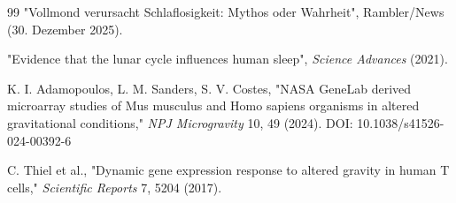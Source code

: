 \documentclass[12pt,a4paper]{article}
\theoremstyle{remark}
\begin{document}
\begin{thebibliography}{99}
		"Vollmond verursacht Schlaflosigkeit: Mythos oder Wahrheit", Rambler/News (30. Dezember 2025).
		
		"Evidence that the lunar cycle influences human sleep", \emph{Science Advances} (2021).
		
		K. I. Adamopoulos, L. M. Sanders, S. V. Costes, "NASA GeneLab derived microarray studies of Mus musculus and Homo sapiens organisms in altered gravitational conditions," \emph{NPJ Microgravity} 10, 49 (2024). DOI: 10.1038/s41526-024-00392-6
		
		C. Thiel et al., "Dynamic gene expression response to altered gravity in human T cells," \emph{Scientific Reports} 7, 5204 (2017).
		
	\end{thebibliography}
	
\end{document}
